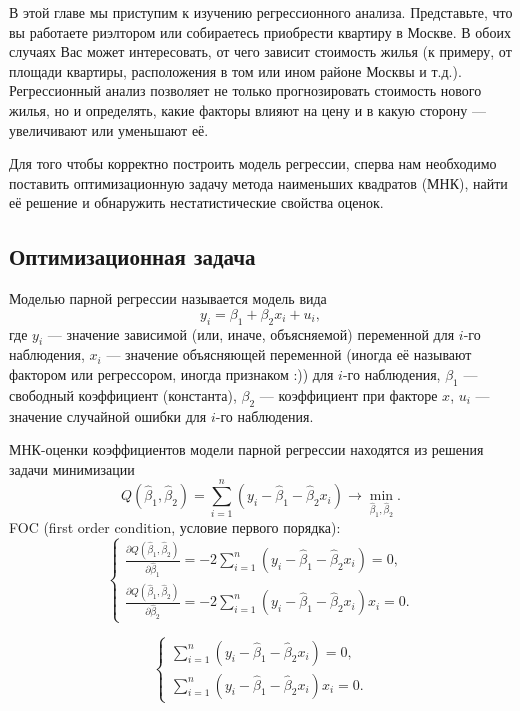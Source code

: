 \documentclass[12pt]{article}
\newcommand{\hb}{\hat{\beta}}
\begin{document}
В этой главе мы приступим к изучению регрессионного анализа. Представьте, что вы работаете риэлтором или собираетесь приобрести квартиру в Москве. 
В обоих случаях Вас может интересовать, от чего зависит стоимость жилья (к примеру, 
от площади квартиры, расположения в том или ином районе Москвы и т.д.). Регрессионный анализ позволяет не только прогнозировать стоимость нового жилья, но и определять, какие факторы влияют на цену и в какую сторону — увеличивают или уменьшают её.

Для того чтобы корректно построить модель регрессии, сперва нам необходимо поставить оптимизационную задачу метода наименьших квадратов (МНК), найти её решение и обнаружить нестатистические свойства оценок. 


\subsection{Оптимизационная задача}\label{sec:optimization}
Моделью парной регрессии называется модель вида
\[
y_i = \beta_1 + \beta_2 x_i + u_i,
\]
где $y_i$ — значение зависимой (или, иначе, объясняемой) переменной для $i$-го наблюдения, $x_{i}$ — значение объясняющей переменной (иногда её называют фактором или регрессором, иногда признаком :)) для $i$-го наблюдения, $\beta_1$ — свободный коэффициент (константа), $\beta_2$ — коэффициент при факторе $x$, $u_i$ — значение случайной ошибки для $i$-го наблюдения.

МНК-оценки коэффициентов модели парной регрессии находятся из решения задачи минимизации
\[
Q(\hb_1, \hb_2) = \sum_{i=1}^n (y_i - \hb_1 - \hb_2 x_i) \to \underset{\hb_1, \hb_2}{\min} .
\]
FOC (first order condition, условие первого порядка):
\begin{equation*}
 \begin{cases}
\frac{\partial Q(\hb_1,\hb_2)}{\partial \hb_1} = -2\sum_{i=1}^n (y_i - \hb_1 - \hb_2 x_i) = 0,
\\
\frac{\partial Q(\hb_1,\hb_2)}{\partial \hb_2} = -2\sum_{i=1}^n (y_i - \hb_1 - \hb_2 x_i)x_i = 0.
 \end{cases}
\end{equation*}

\begin{equation*}
 \begin{cases}
\sum_{i=1}^n (y_i - \hb_1 - \hb_2 x_i) = 0,
\\
\sum_{i=1}^n (y_i - \hb_1 - \hb_2 x_i)x_i = 0.
 \end{cases}
\end{equation*}
\end{document}
